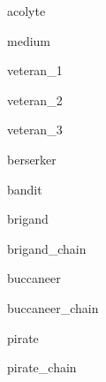 \documentclass[letterpaper,serif]{module}
\begin{document}
\begin{newmonster}{acolyte}\end{newmonster}

\begin{newmonster}{medium}\end{newmonster}

\begin{newmonster}{veteran_1}\end{newmonster}

\begin{newmonster}{veteran_2}\end{newmonster}

\begin{newmonster}{veteran_3}\end{newmonster}

\begin{newmonster}{berserker}\end{newmonster}

\begin{newmonster}{bandit}\end{newmonster}

\begin{newmonster}{brigand}\end{newmonster}

\begin{newmonster}{brigand_chain}\end{newmonster}

\begin{newmonster}{buccaneer}\end{newmonster}

\begin{newmonster}{buccaneer_chain}\end{newmonster}

\begin{newmonster}{pirate}\end{newmonster}

\begin{newmonster}{pirate_chain}\end{newmonster}
\end{document}
